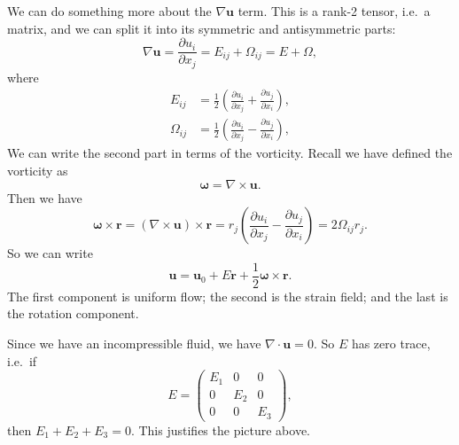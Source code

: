 \documentclass[a4paper]{article}
\begin{document}
We can do something more about the $\nabla \mathbf{u}$ term. This is a rank-2 tensor, i.e.\ a matrix, and we can split it into its symmetric and antisymmetric parts:
\[
  \nabla \mathbf{u} = \frac{\partial u_i}{\partial x_j} = E_{ij} + \Omega_{ij} = E + \Omega,
\]
where
\begin{align*}
  E_{ij} &= \frac{1}{2}\left(\frac{\partial u_i}{\partial x_j} + \frac{\partial u_j}{\partial x_i}\right),\\
  \Omega_{ij} &=\frac{1}{2}\left(\frac{\partial u_i}{\partial x_j} - \frac{\partial u_j}{\partial x_i}\right),
\end{align*}
We can write the second part in terms of the vorticity. Recall we have defined the vorticity as
\[
  \boldsymbol\omega = \nabla \times \mathbf{u}.
\]
Then we have
\[
  \boldsymbol\omega \times \mathbf{r} = (\nabla \times \mathbf{u}) \times \mathbf{r} = r_j \left(\frac{\partial u_i}{\partial x_j} - \frac{\partial u_j}{\partial x_i}\right) = 2 \Omega_{ij}r_j.
\]
So we can write
\[
  \mathbf{u} = \mathbf{u}_0 + E \mathbf{r} + \frac{1}{2} \boldsymbol\omega \times \mathbf{r}.
\]
The first component is uniform flow; the second is the strain field; and the last is the rotation component.
\begin{center}
\end{center}
Since we have an incompressible fluid, we have $\nabla \cdot \mathbf{u} = 0$. So $E$ has zero trace, i.e.\ if
\[
  E =
  \begin{pmatrix}
    E_1 & 0 & 0\\
    0 & E_2 & 0\\
    0 & 0 & E_3
  \end{pmatrix},
\]
then $E_1 + E_2 + E_3 = 0$. This justifies the picture above.
\end{document}
